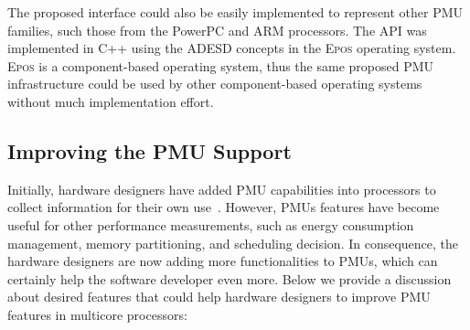 \documentclass[conference]{IEEEtran}
\begin{document}
The proposed interface could also be easily implemented to represent other PMU families, such those from the PowerPC and ARM processors. The API was implemented in C++ using the ADESD concepts in the \textsc{Epos} operating system. \textsc{Epos} is a component-based operating system, thus the same proposed PMU infrastructure could be used by other component-based operating systems without much implementation effort. 

\subsection{Improving the PMU Support}

Initially, hardware designers have added PMU capabilities into processors to collect information for their own use~\cite{Tam:2007}. However, PMUs features have become useful for other performance measurements, such as energy consumption management, memory partitioning, and scheduling decision. In consequence, the hardware designers are now adding more functionalities to PMUs, which can certainly help the software developer even more. Below we provide a discussion about desired features that could help hardware designers to improve PMU features in multicore processors:
\end{document}
